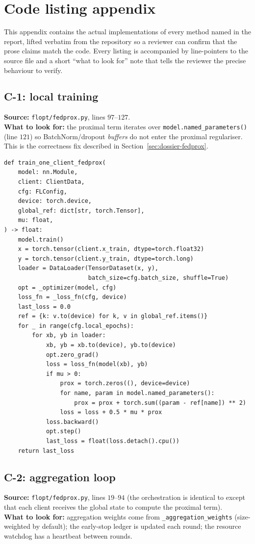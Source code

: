 \section{Code listing appendix}
\label{sec:code-appendix}

This appendix contains the actual implementations of every method
named in the report, lifted verbatim from the repository so a
reviewer can confirm that the prose claims match the code. Every
listing is accompanied by line-pointers to the source file and a
short ``what to look for'' note that tells the reviewer the precise
behaviour to verify.

\subsection{C-1: \fedprox{} local training}
\textbf{Source:} \texttt{flopt/fedprox.py}, lines $97$--$127$.\\
\textbf{What to look for:} the proximal term iterates over
\texttt{model.named\_parameters()} (line $121$) so BatchNorm/dropout
\emph{buffers} do not enter the proximal regulariser. This is the
correctness fix described in Section~\ref{sec:dossier-fedprox}.

\begin{lstlisting}
def train_one_client_fedprox(
    model: nn.Module,
    client: ClientData,
    cfg: FLConfig,
    device: torch.device,
    global_ref: dict[str, torch.Tensor],
    mu: float,
) -> float:
    model.train()
    x = torch.tensor(client.x_train, dtype=torch.float32)
    y = torch.tensor(client.y_train, dtype=torch.long)
    loader = DataLoader(TensorDataset(x, y),
                        batch_size=cfg.batch_size, shuffle=True)
    opt = _optimizer(model, cfg)
    loss_fn = _loss_fn(cfg, device)
    last_loss = 0.0
    ref = {k: v.to(device) for k, v in global_ref.items()}
    for _ in range(cfg.local_epochs):
        for xb, yb in loader:
            xb, yb = xb.to(device), yb.to(device)
            opt.zero_grad()
            loss = loss_fn(model(xb), yb)
            if mu > 0:
                prox = torch.zeros((), device=device)
                for name, param in model.named_parameters():
                    prox = prox + torch.sum((param - ref[name]) ** 2)
                loss = loss + 0.5 * mu * prox
            loss.backward()
            opt.step()
            last_loss = float(loss.detach().cpu())
    return last_loss
\end{lstlisting}

\subsection{C-2: \fedprox{} aggregation loop}
\textbf{Source:} \texttt{flopt/fedprox.py}, lines $19$--$94$
(the orchestration is identical to \fedavg{} except that each
client receives the global state to compute the proximal term).
\\
\textbf{What to look for:} aggregation weights come from
\texttt{\_aggregation\_weights} (size-weighted by default); the
early-stop ledger is updated each round; the resource watchdog has
a heartbeat between rounds.

